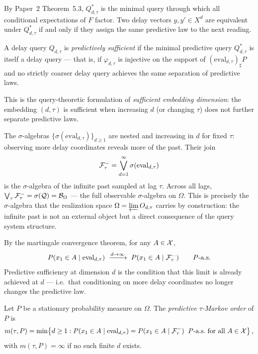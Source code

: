 By Paper~2 Theorem~5.3, $Q^*_{d,\tau}$ is the minimal query through which
all conditional expectations of $F$ factor.  Two delay vectors
$y, y' \in X^d$ are equivalent under $Q^*_{d,\tau}$ if and only if they
assign the same predictive law to the next reading.

\begin{definition}\label{def:pred-sufficient}
A delay query $Q_{d,\tau}$ is \emph{predictively sufficient} if the
minimal predictive query $Q^*_{d,\tau}$ is itself a delay query --- that
is, if $\varphi_{d,\tau}$ is injective on the support of
$(\mathrm{eval}_{d,\tau})_\sharp P$ and no strictly coarser delay query
achieves the same separation of predictive laws.
\end{definition}

This is the query-theoretic formulation of \emph{sufficient embedding
dimension}: the embedding $(d,\tau)$ is sufficient when increasing $d$
(or changing $\tau$) does not further separate predictive laws.

\begin{remark}
The $\sigma$-algebras $\{\sigma(\mathrm{eval}_{d,\tau})\}_{d \geq 1}$ are
nested and increasing in $d$ for fixed $\tau$: observing more delay
coordinates reveals more of the past.  Their join
\[
  \mathcal{F}_\tau^- = \bigvee_{d=1}^\infty \sigma(\mathrm{eval}_{d,\tau})
\]
is the $\sigma$-algebra of the infinite past sampled at lag $\tau$.
Across all lags, $\bigvee_\tau \mathcal{F}_\tau^- = \sigma(\mathcal{Q}) = \mathcal{B}_\Omega$
--- the full observable $\sigma$-algebra on $\Omega$.  This is precisely the
$\sigma$-algebra that the realization space $\Omega = \varprojlim O_{d,\tau}$
carries by construction: the infinite past is not an external object but a
direct consequence of the query system structure.

By the martingale convergence theorem, for any $A \in \mathcal{X}$,
\[
  P(x_1 \in A \mid \mathrm{eval}_{d,\tau})
  \;\xrightarrow{d \to \infty}\;
  P(x_1 \in A \mid \mathcal{F}_\tau^-)
  \qquad P\text{-a.s.}
\]
Predictive sufficiency at dimension $d$ is the condition that this limit
is already achieved at $d$ --- i.e.\ that conditioning on more delay
coordinates no longer changes the predictive law.
\end{remark}

\begin{definition}\label{def:markov-order}
Let $P$ be a stationary probability measure on $\Omega$.  The
\emph{predictive $\tau$-Markov order} of $P$ is
\[
  m(\tau, P)
  = \min\!\left\{d \geq 1 :
    P(x_1 \in A \mid \mathrm{eval}_{d,\tau})
    = P(x_1 \in A \mid \mathcal{F}_\tau^-)
    \;\; P\text{-a.s.\ for all } A \in \mathcal{X}
  \right\},
\]
with $m(\tau, P) = \infty$ if no such finite $d$ exists.
\end{definition}

